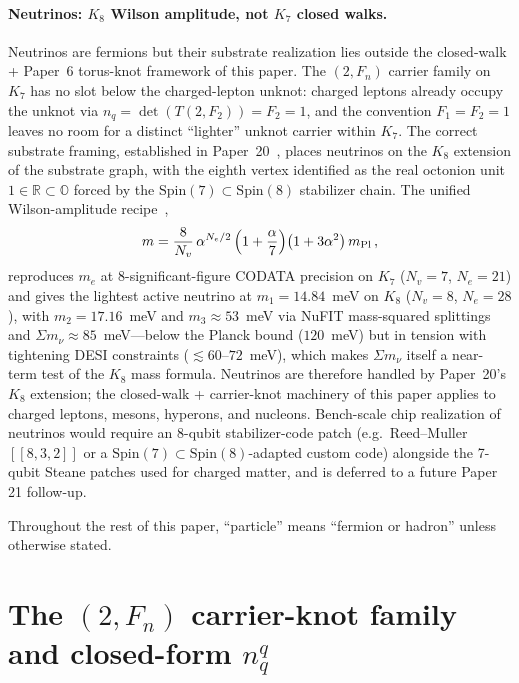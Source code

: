 \documentclass[11pt]{article}
\begin{document}
\paragraph{Neutrinos: $K_8$ Wilson amplitude, not $K_7$ closed walks.}
Neutrinos are fermions but their substrate realization lies outside the closed-walk + Paper~6 torus-knot framework of this paper.  The $(2, F_n)$ carrier family on $K_7$ has no slot below the charged-lepton unknot: charged leptons already occupy the unknot via $n_q = \det(T(2, F_2)) = F_2 = 1$, and the convention $F_1 = F_2 = 1$ leaves no room for a distinct ``lighter'' unknot carrier within $K_7$.  The correct substrate framing, established in Paper~20~\cite{Paper20}, places neutrinos on the $K_8$ extension of the substrate graph, with the eighth vertex identified as the real octonion unit $1 \in \mathbb{R} \subset \mathbb{O}$ forced by the $\mathrm{Spin}(7) \subset \mathrm{Spin}(8)$ stabilizer chain.  The unified Wilson-amplitude recipe~\cite[eq.~5.1]{Paper20},
\begin{equation}
  m = \frac{8}{N_v}\,\alpha^{N_e/2}\,\Bigl(1 + \frac{\alpha}{7}\Bigr)\bigl(1 + 3\alpha^2\bigr)\,m_\text{Pl} \, ,
\end{equation}
reproduces $m_e$ at $8$-significant-figure CODATA precision on $K_7$ ($N_v = 7$, $N_e = 21$) and gives the lightest active neutrino at $m_1 = 14.84$~meV on $K_8$ ($N_v = 8$, $N_e = 28$), with $m_2 = 17.16$~meV and $m_3 \approx 53$~meV via NuFIT mass-squared splittings and $\Sigma m_\nu \approx 85$~meV---below the Planck bound ($120$~meV) but in tension with tightening DESI constraints ($\lesssim 60$--$72$~meV), which makes $\Sigma m_\nu$ itself a near-term test of the $K_8$ mass formula.  Neutrinos are therefore handled by Paper~20's $K_8$ extension; the closed-walk + carrier-knot machinery of this paper applies to charged leptons, mesons, hyperons, and nucleons.  Bench-scale chip realization of neutrinos would require an 8-qubit stabilizer-code patch (e.g.\ Reed--Muller $[\![8, 3, 2]\!]$ or a $\mathrm{Spin}(7) \subset \mathrm{Spin}(8)$-adapted custom code) alongside the 7-qubit Steane patches used for charged matter, and is deferred to a future Paper 21 follow-up.

Throughout the rest of this paper, ``particle'' means ``fermion or hadron'' unless otherwise stated.

\section{The $(2, F_n)$ carrier-knot family and closed-form $n_q^q$}
\label{sec:carrier-family}
\end{document}
